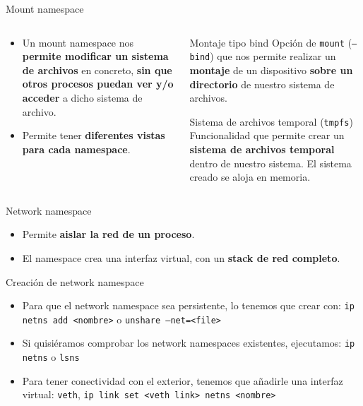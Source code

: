\documentclass[aspectratio=169,xcolor=dvipsnames]{beamer}
\begin{document}
    \begin{frame}{Mount namespace}
        \begin{columns}
            \begin{column}{0.5\textwidth}
                \begin{itemize}
                    \item Un mount namespace nos \textbf{permite modificar un sistema de archivos} en concreto, \textbf{sin que otros procesos puedan ver y/o acceder} a dicho sistema de archivo.
                    \item Permite tener \textbf{diferentes vistas para cada namespace}.
                \end{itemize}
            \end{column}
        
            \begin{column}{0.5\textwidth}
                \begin{alertblock}{Montaje tipo bind}
                    Opción de \texttt{mount} (\texttt{--bind}) que nos permite realizar un \textbf{montaje} de un dispositivo \textbf{sobre un directorio} de nuestro sistema de archivos.
                \end{alertblock}
                
                \begin{alertblock}{Sistema de archivos temporal (\texttt{tmpfs})}
                    Funcionalidad que permite crear un \textbf{sistema de archivos temporal} dentro de nuestro sistema. El sistema creado se aloja en memoria.
                \end{alertblock}
            \end{column}
        \end{columns}
    \end{frame}
    
    \begin{frame}{Network namespace}
        \begin{itemize}
            \item Permite \textbf{aislar la red de un proceso}.
            \item El namespace crea una interfaz virtual, con un \textbf{stack de red completo}.
        \end{itemize}
        
        \begin{exampleblock}{Creación de network namespace}
            \begin{itemize}
                \item Para que el network namespace sea persistente, lo tenemos que crear con: \texttt{ip netns add <nombre>} o \texttt{unshare --net=<file>}
                \item Si quisiéramos comprobar los network namespaces existentes, ejecutamos: \texttt{ip netns} o \texttt{lsns}
                \item Para tener conectividad con el exterior, tenemos que añadirle una interfaz virtual: \texttt{veth}, \texttt{ip link set <veth link> netns <nombre>}
            \end{itemize}
        \end{exampleblock}
    \end{frame}
    
\end{document}
